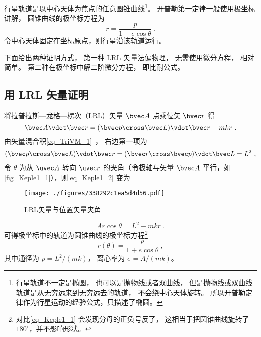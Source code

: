 

行星轨道是以中心天体为焦点的任意圆锥曲线\footnote{行星轨道不一定是椭圆， 也可以是抛物线或者双曲线， 但是抛物线或双曲线轨道是从无穷远来到无穷远去的轨道， 不会绕中心天体旋转。 所以开普勒定律作为行星运动的经验公式，只描述了椭圆。}。 开普勒第一定律一般使用极坐标讲解， 圆锥曲线的极坐标方程为
\begin{equation}\label{eq_Keple1_1}
r = \frac{p}{1 - e \cos \theta }~.
\end{equation}
令中心天体固定在坐标原点，则行星沿该轨道运行。

下面给出两种证明方式， 第一种 LRL 矢量法偏物理， 无需使用微分方程， 相对简单。 第二种在极坐标中解二阶微分方程， 即比耐公式。

\subsection{用 LRL 矢量证明}

将拉普拉斯—龙格—楞次（LRL）矢量 $\bvec A$ 点乘位矢 $\bvec r$ 得
\begin{equation}\label{eq_Keple1_2}
\bvec A \vdot \bvec r = (\bvec p \cross \bvec L)\vdot \bvec r - mkr~.
\end{equation}
由矢量混合积\autoref{eq_TriVM_1}~， 右边第一项为
\begin{equation}
(\bvec p \cross \bvec L)\vdot \bvec r = (\bvec r \cross \bvec p)\vdot \bvec L = L^2~,
\end{equation}
令 $\theta$ 为从 $\uvec A$ 转向 $\uvec r$ 的夹角（令极轴与矢量 $\bvec A$ 平行，如\autoref{fig_Keple1_1}），则\autoref{eq_Keple1_2} 变为
\begin{figure}[ht]
\centering
\texttt{[image: ./figures/338292c1ea5d4d56.pdf]}
\caption{LRL矢量与位置矢量夹角} \label{fig_Keple1_1}
\end{figure}
\begin{equation}
Ar\cos\theta = L^2 - mkr~.
\end{equation}
可得极坐标中的轨道为圆锥曲线的极坐标方程\footnote{对比\autoref{eq_Keple1_1} 会发现分母的正负号反了， 这相当于把圆锥曲线旋转了 $180^\circ$，并不影响形状。}
\begin{equation}
r(\theta) = \frac{p}{1 + e\cos\theta}~,
\end{equation}
其中通径为 $p = L^2/(mk)$， 离心率为 $e = A/(mk)$。

